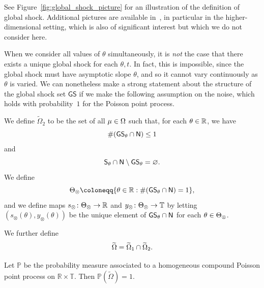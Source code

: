 \documentclass[AHL,Unicode,longabstracts]{cedram}
\newcounter{setofcase}
\newcounter{case}[setofcase]
\newcommand*\ssS{\mathsf{S}}
\newcommand*\GS{\mathsf{GS}}
\newcommand*\ssN{\mathsf{N}}
\newcommand*\TT{\mathbb{T}}
\newcommand*\RR{\mathbb{R}}
\newcommand{\bbP}{\mathbb{P}}
\newcommand*\st{\mathrel{:}}
\renewcommand*{\to}{\mathchoice{\longrightarrow}{\rightarrow}{\rightarrow}{\rightarrow}}
\let\oldin\in
\renewcommand{\in}{\mathchoice{\oldin}{\oldin}{\,\oldin\,}{\,\oldin\,}}
\let\oldcap\cap
\renewcommand{\cap}{\mathchoice{\oldcap}{\oldcap}{\,\oldcap\,}{\,\oldcap\,}}
\newcommand*\TT{\mathbb{T}}
\newcommand*\RR{\mathbb{R}}
\begin{document}
See Figure~\ref{fig:global_shock_picture} for an illustration of the definition of global shock. Additional pictures are available in~\cite{BIK02,BK07}, in particular in the higher-dimensional setting, which is also of significant interest but which we do not consider here.

When we consider all values of $\theta$ simultaneously, it is \emph{not }the case that there exists a unique global shock for each $\theta,t$. In fact, this is impossible, since the global shock must have asymptotic slope $\theta$, and so it cannot vary continuously as $\theta$ is varied. We can nonetheless make a strong statement about the structure of the global shock set $\GS$ if we make the following assumption on the noise, which holds with probability~$1$ for the Poisson point process.
\begin{defi}\label{def:Omegatilde2}
We define $\widetilde{\Omega}_{2}$ to be the set of all $\mu\in\Omega$ such that, for each $\theta\in\RR$, we have
\begin{equation}\label{eq:GSNlt1}
\#(\GS_{\theta}\cap\ssN)\le1
\end{equation}
and
\begin{equation}\label{eq:allshockNsglobal}
\ssS_{\theta}\cap\ssN\setminus\GS_{\theta}=\varnothing.
\end{equation}
We define
\begin{equation}\label{eq:Theta1def}
\Theta_{\otimes}\coloneqq\{\theta\in\RR\st\#(\GS_{\theta}\cap\ssN)=1\},
\end{equation}
and we define maps $s_{\otimes}\colon\Theta_{\otimes}\to\RR$ and $y_{\otimes}\colon\Theta_{\otimes}\to\TT$ by letting $(s_{\otimes}(\theta),y_{\otimes}(\theta))$ be the unique element of $\GS_{\theta}\cap\ssN$ for each $\theta\in\Theta_{\otimes}$.

We further define
\[
\widetilde{\Omega}=\widetilde{\Omega}_{1}\cap\widetilde{\Omega}_{2}.
\]
\end{defi}

\begin{theo}\label{thm:poisson-ok}
Let $\bbP$ be the probability measure associated to a homogeneous compound Poisson point process on $ \RR\times\TT$. Then $\bbP(\widetilde{\Omega})=1$.
\end{theo}
\end{document}
